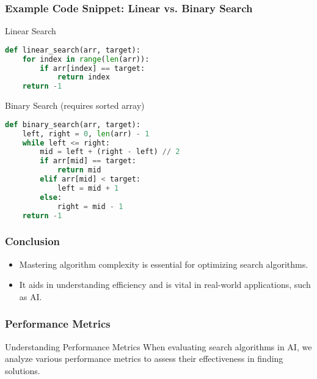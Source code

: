 \documentclass[aspectratio=169]{beamer}
\begin{document}
\begin{frame}[fragile]
    \frametitle{Example Code Snippet: Linear vs. Binary Search}
    \begin{block}{Linear Search}
    \begin{lstlisting}[language=Python]
def linear_search(arr, target):
    for index in range(len(arr)):
        if arr[index] == target:
            return index
    return -1
    \end{lstlisting}
    \end{block}
    \begin{block}{Binary Search (requires sorted array)}
    \begin{lstlisting}[language=Python]
def binary_search(arr, target):
    left, right = 0, len(arr) - 1
    while left <= right:
        mid = left + (right - left) // 2
        if arr[mid] == target:
            return mid
        elif arr[mid] < target:
            left = mid + 1
        else:
            right = mid - 1
    return -1
    \end{lstlisting}
    \end{block}
\end{frame}

\begin{frame}
    \frametitle{Conclusion}
    \begin{itemize}
        \item Mastering algorithm complexity is essential for optimizing search algorithms.
        \item It aids in understanding efficiency and is vital in real-world applications, such as AI.
    \end{itemize}
\end{frame}

\begin{frame}[fragile]
    \frametitle{Performance Metrics}
    \begin{block}{Understanding Performance Metrics}
        When evaluating search algorithms in AI, we analyze various performance metrics to assess their effectiveness in finding solutions.
    \end{block}
\end{frame}
\end{document}

